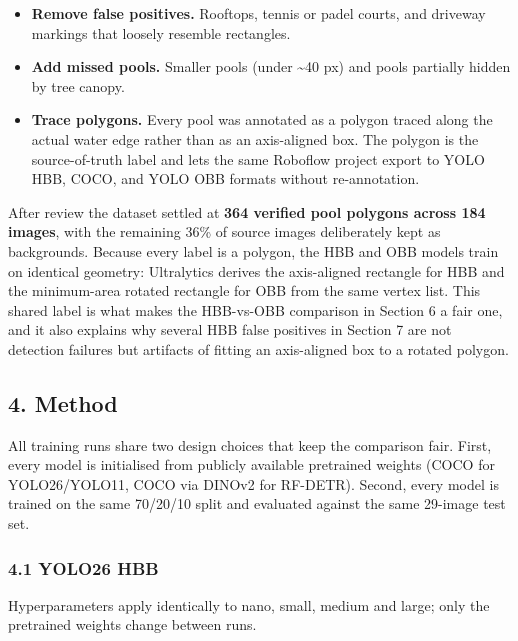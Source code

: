 \documentclass[11pt
]{article}
\providecommand{\tightlist}{%
  \setlength{\itemsep}{0pt}\setlength{\parskip}{0pt}}
\begin{document}
\begin{itemize}
\tightlist
\item
  \textbf{Remove false positives.} Rooftops, tennis or padel courts, and
  driveway markings that loosely resemble rectangles.
\item
  \textbf{Add missed pools.} Smaller pools (under \textasciitilde40 px)
  and pools partially hidden by tree canopy.
\item
  \textbf{Trace polygons.} Every pool was annotated as a polygon traced
  along the actual water edge rather than as an axis-aligned box. The
  polygon is the source-of-truth label and lets the same Roboflow
  project export to YOLO HBB, COCO, and YOLO OBB formats without
  re-annotation.
\end{itemize}

After review the dataset settled at \textbf{364 verified pool polygons
across 184 images}, with the remaining 36\% of source images
deliberately kept as backgrounds. Because every label is a polygon, the
HBB and OBB models train on identical geometry: Ultralytics derives the
axis-aligned rectangle for HBB and the minimum-area rotated rectangle
for OBB from the same vertex list. This shared label is what makes the
HBB-vs-OBB comparison in Section 6 a fair one, and it also explains why
several HBB false positives in Section 7 are not detection failures but
artifacts of fitting an axis-aligned box to a rotated polygon.

\subsection{4. Method}\label{method}

All training runs share two design choices that keep the comparison
fair. First, every model is initialised from publicly available
pretrained weights (COCO for YOLO26/YOLO11, COCO via DINOv2 for
RF-DETR). Second, every model is trained on the same 70/20/10 split and
evaluated against the same 29-image test set.

\subsubsection{4.1 YOLO26 HBB}\label{yolo26-hbb}

Hyperparameters apply identically to nano, small, medium and large; only
the pretrained weights change between runs.
\end{document}
